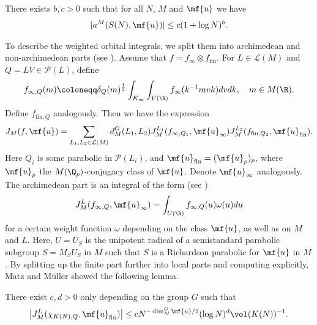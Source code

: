 \begin{lem}\label{coeffbound}
    There exists $b,c>0$ such that for all $N$, $M$ and $\mf{u}$ we have
    \begin{align*}
        |a^M(S(N),\mf{u})|\leq c(1+\log N)^b.
    \end{align*}
\end{lem}

\noindent To describe the weighted orbital integrals, we split them into archimedean and non-archimedean parts (see \cite{Arthur3}). Assume that $f=f_\infty\otimes f_{\text{fin}}$. For $L\in\mathcal{L}(M)$ and $Q=LV\in\mathcal{P}(L)$, define
\begin{align}\label{subq}
    f_{\infty,Q}(m) \coloneqq \delta_Q(m)^{\frac12}\int_{K_\infty}\int_{V(\R)}f_\infty(k^{-1}mvk)dv dk, \quad m\in M(\R).
\end{align}
Define $f_{\text{fin},Q}$ analogously. Then we have the expression
\begin{align}\label{localparts}
    J_M(f,\mf{u}) = \sum_{L_1,L_2\in\mathcal{L}(M)} d_M^G(L_1,L_2)J^{L_1}_M(f_{\infty,Q_1},\mf{u}_\infty)J_M^{L_2}(f_{\text{fin},Q_2},\mf{u}_{\text{fin}}).
\end{align}
Here $Q_i$ is some parabolic in $\mathcal{P}(L_i)$, and $\mf{u}_{\text{fin}}=(\mf{u}_p)_p$, where $\mf{u}_p$ the $M(\Q_p)$-conjugacy class of $\mf{u}$. Denote $\mf{u}_\infty$ analogously. The archimedean part is an integral of the form (see \cite{Arthur1})
\begin{align*}
    J^{L}_M(f_{\infty,Q},\mf{u}_\infty) = \int_{U(\R)}f_{\infty,Q}(u)\omega(u) du
\end{align*}
for a certain weight function $\omega$ depending on the class $\mf{u}$, as well as on $M$ and $L$. Here, $U=U_S$ is the unipotent radical of a semistandard parabolic subgroup $S=M_SU_S$ in $M$ such that $S$ is a Richardson parabolic for $\mf{u}$ in $M$. By splitting up the finite part further into local parts and computing explicitly, Matz and Müller showed the following lemma.
\begin{lem}\label{localbound}
There exist $c,d>0$ only depending on the group $G$ such that
    \begin{align*}
   \left\vert J_M^L(\chi_{{K(N)},Q},\mf{u}_{\text{fin}})\right\vert \leq c N^{-\dim^G_M \mf{u}/2}(\log N)^d\vol(K(N))^{-1}.
\end{align*}
\end{lem}


